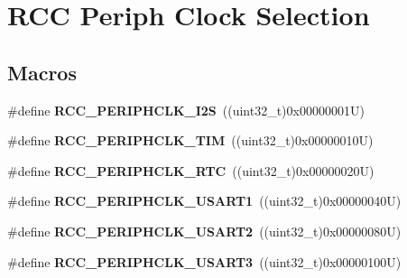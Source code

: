 \hypertarget{group___r_c_c_ex___periph___clock___selection}{}\section{R\+CC Periph Clock Selection}
\label{group___r_c_c_ex___periph___clock___selection}
\subsection*{Macros}
\begin{DoxyCompactItemize}
\item 
\mbox{\label{group___r_c_c_ex___periph___clock___selection_ga9434a99ec49907a6d2ce7ee7e29deb75}} 
\#define {\bfseries R\+C\+C\+\_\+\+P\+E\+R\+I\+P\+H\+C\+L\+K\+\_\+\+I2S}~((uint32\+\_\+t)0x00000001\+U)
\item 
\mbox{\label{group___r_c_c_ex___periph___clock___selection_ga6a377fb8665c389cb263cddbfa44bec6}} 
\#define {\bfseries R\+C\+C\+\_\+\+P\+E\+R\+I\+P\+H\+C\+L\+K\+\_\+\+T\+IM}~((uint32\+\_\+t)0x00000010\+U)
\item 
\mbox{\label{group___r_c_c_ex___periph___clock___selection_gaede03aaafb5319bb39767bf50182406f}} 
\#define {\bfseries R\+C\+C\+\_\+\+P\+E\+R\+I\+P\+H\+C\+L\+K\+\_\+\+R\+TC}~((uint32\+\_\+t)0x00000020\+U)
\item 
\mbox{\label{group___r_c_c_ex___periph___clock___selection_ga45390869c206531ea6d98baefb2315ac}} 
\#define {\bfseries R\+C\+C\+\_\+\+P\+E\+R\+I\+P\+H\+C\+L\+K\+\_\+\+U\+S\+A\+R\+T1}~((uint32\+\_\+t)0x00000040\+U)
\item 
\mbox{\label{group___r_c_c_ex___periph___clock___selection_ga5d259e3e1607db6e547d525043246387}} 
\#define {\bfseries R\+C\+C\+\_\+\+P\+E\+R\+I\+P\+H\+C\+L\+K\+\_\+\+U\+S\+A\+R\+T2}~((uint32\+\_\+t)0x00000080\+U)
\item 
\mbox{\label{group___r_c_c_ex___periph___clock___selection_ga8640cec93bf5d59d0f1beddd3bd7ec21}} 
\#define {\bfseries R\+C\+C\+\_\+\+P\+E\+R\+I\+P\+H\+C\+L\+K\+\_\+\+U\+S\+A\+R\+T3}~((uint32\+\_\+t)0x00000100\+U)

\end{DoxyCompactItemize}
